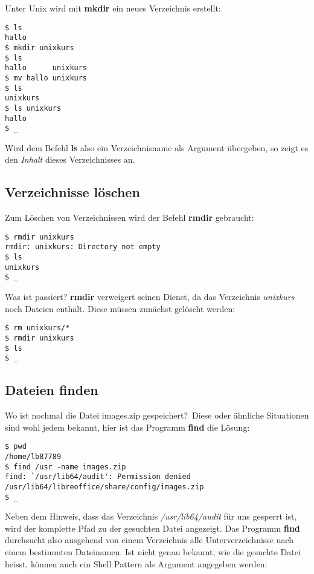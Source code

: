 \documentclass[titlepage,a4paper]{article}
\begin{document}
Unter Unix wird mit \textbf{mkdir} ein neues Verzeichnis erstellt:

\begin{verbatim}
$ ls
hallo
$ mkdir unixkurs
$ ls
hallo      unixkurs
$ mv hallo unixkurs
$ ls
unixkurs
$ ls unixkurs
hallo
$ _
\end{verbatim}

Wird dem Befehl \textbf{ls} also ein Verzeichnisname als Argument übergeben,
so zeigt es den \emph{Inhalt} dieses Verzeichnisses an.


\subsection{Verzeichnisse löschen}
\label{sec:rmdir}

Zum Löschen von Verzeichnissen wird der Befehl \textbf{rmdir} gebraucht:

\begin{verbatim}
$ rmdir unixkurs
rmdir: unixkurs: Directory not empty
$ ls
unixkurs
$ _
\end{verbatim}

Was ist passiert? \textbf{rmdir} verweigert seinen Dienst, da das Verzeichnis
\emph{unixkurs} noch Dateien enthält.  Diese müssen zunächst gelöscht werden:

\begin{verbatim}
$ rm unixkurs/*
$ rmdir unixkurs
$ ls
$ _
\end{verbatim}

\subsection{Dateien finden}
\label{sec:find}

\glqq Wo ist nochmal die Datei images.zip gespeichert?\grqq\   
Diese oder ähnliche Situationen sind wohl jedem bekannt,
hier ist das Programm \textbf{find} die Lösung:

\begin{verbatim}
$ pwd
/home/lb87789
$ find /usr -name images.zip
find: `/usr/lib64/audit': Permission denied
/usr/lib64/libreoffice/share/config/images.zip
$ _
\end{verbatim}

Neben dem Hinweis, dass das Verzeichnis \emph{/usr/lib64/audit}
für uns gesperrt ist, wird der komplette Pfad zu der gesuchten Datei angezeigt.
Das Programm \textbf{find} durchsucht also ausgehend von einem Verzeichnis
alle Unterverzeichnisse nach einem bestimmten Dateinamen.  Ist nicht genau
bekannt, wie die gesuchte Datei heisst, können auch ein Shell Pattern als Argument
angegeben werden:
\end{document}
